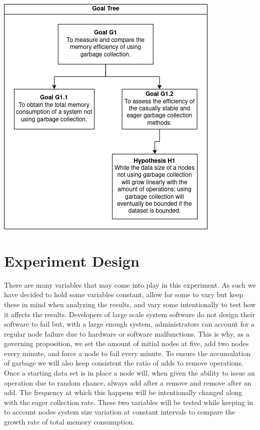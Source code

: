 \documentclass{article}
\begin{document}
\begin{multicols}{2}
\begin{refsection}

\includegraphics[width=\columnwidth]{goal_tree}

\section*{Experiment Design}

There are many variables that may come into play in this experiment. As such we have decided to hold some variables constant, allow for some to vary but keep these in mind when analyzing the results, and vary some intentionally to test how it affects the results. Developers of large scale system software do not design their software to fail but, with a large enough system, administrators can account for a regular node failure due to hardware or software malfunctions. This is why, as a governing proposition, we set the amount of initial nodes at five, add two nodes every minute, and force a node to fail every minute. To ensure the accumulation of garbage we will also keep consistent the ratio of adds to remove operations. Once a starting data set is in place a node will, when given the ability to issue an operation due to random chance, always add after a remove and remove after an add. The frequency at which this happens will be intentionally changed along with the eager collection rate. These two variables will be tested while keeping in to account nodes system size variation at constant intervals to compare the growth rate of total memory consumption.


\end{refsection}
\end{multicols}
\end{document}
